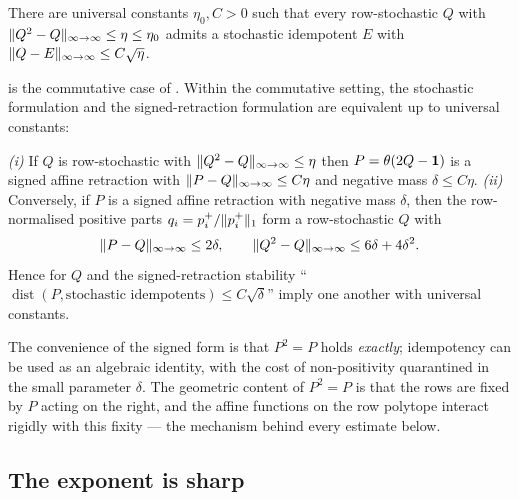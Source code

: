 \begin{openproblem}\label{op:classical}
There are universal constants $\eta_0,C>0$ such that every row-stochastic $Q$
with $\lVert Q^2-Q \rVert_{\infty\to\infty}\le\eta\le\eta_0$ admits a stochastic
idempotent $E$ with $\lVert Q-E \rVert_{\infty\to\infty}\le C\sqrt{\eta}$.
\end{openproblem}

 is the commutative case of . Within the
commutative setting, the stochastic formulation and the signed-retraction
formulation are equivalent up to universal constants:

\begin{lemma}\label{lem:classical-equiv}
\emph{(i)} If $Q$ is row-stochastic with $\lVert Q^2-Q \rVert_{\infty\to\infty}\le\eta$
then $P=\theta(2Q-\mathbf{1})$ is a signed affine retraction with
$\lVert P-Q \rVert_{\infty\to\infty}\le C\eta$ and negative mass $\delta\le C\eta$.
\emph{(ii)} Conversely, if $P$ is a signed affine retraction with negative mass
$\delta$, then the row-normalised positive parts $q_i=p_i^{+}/\lVert p_i^{+} \rVert_1$
form a row-stochastic $Q$ with
\[
  \lVert P-Q \rVert_{\infty\to\infty}\le2\delta,\qquad
  \lVert Q^2-Q \rVert_{\infty\to\infty}\le6\delta+4\delta^2 .
\]
Hence  for $Q$ and the signed-retraction stability
``$\operatorname{dist}(P,\text{stochastic idempotents})\le C\sqrt\delta$'' imply
one another with universal constants.
\end{lemma}

\noindent The convenience of the signed form is that $P^2=P$ holds
\emph{exactly}; idempotency can be used as an algebraic identity, with the cost
of non-positivity quarantined in the small parameter $\delta$. The geometric
content of $P^2=P$ is that the rows are fixed by $P$ acting on the right, and the
affine functions on the row polytope interact rigidly with this fixity --- the
mechanism behind every estimate below.

\subsection{The exponent is sharp}

